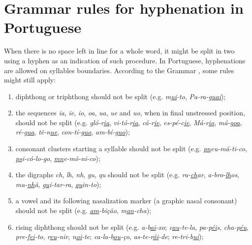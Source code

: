 \documentclass{article}
\begin{document}
\section{Grammar rules for hyphenation in Portuguese}
When there is no space left in line for a whole word, it might be split in two
using a hyphen as an indication of such procedure. In Portuguese, hyphenations
are allowed on syllables boundaries. According to the Grammar
\cite{cunha2016,bergstrom2011}, some rules might still apply:
\begin{enumerate}
    \item\label{rule-di-triphthong} diphthong or triphthong should not be split
	(e.g. \emph{m\underline{\emph{ui}}-to}, \emph{Pa-ra-g\underline{\emph{uai}}});
    \item\label{rule-unstressed} the sequences \emph{ia}, \emph{ie}, \emph{io}, \emph{oa}, \emph{ua},
	\emph{ue} and \emph{uo}, when in final unstressed position, should not be split 
	(e.g. \emph{gló-r\underline{\emph{ia}}}, \emph{vi-tó-r\underline{\emph{ia}}}, 
	\emph{cá-r\underline{\emph{ie}}}, \emph{es-pé-c\underline{\emph{ie}}}, 
	\emph{Má-r\underline{\emph{io}}}, \emph{má-g\underline{\emph{oa}}}, 
	\emph{ré-g\underline{\emph{ua}}}, \emph{tê-n\underline{\emph{ue}}}, 
	\emph{con-tí-g\underline{\emph{uo}}}, \emph{am-bí-g\underline{\emph{uo}}});
    \item\label{rule-c-clusters} consonant clusters starting a syllable should not be
	split (e.g. \emph{\underline{\emph{pn}}eu-má-ti-co}, \emph{\underline{\emph{ps}}i-có-lo-go}, 
	\emph{\underline{\emph{mn}}e-mô-ni-co});
    \item\label{rules-digraphs-ns} the digraphs \emph{ch}, \emph{lh}, \emph{nh}, \emph{gu}, \emph{qu} 
	should not be split (e.g. \emph{ra-\underline{\emph{ch}}ar},
	\emph{a-bro-\underline{\emph{lh}}os}, \emph{ma-\underline{\emph{nh}}ã},
	\emph{\underline{\emph{gu}}i-tar-ra}, \emph{\underline{\emph{qu}}in-to});
    \item\label{rule-nasalization} a vowel and its following nasalization marker (a graphic
	nasal consonant) should not be split (e.g. \emph{\underline{\emph{am}}-bição},
	\emph{m\underline{\emph{an}}-cha});
    \item\label{rule-rising} rising diphthong should not be split (e.g.
	\emph{a-b\underline{\emph{ai}}-xo}; \emph{c\underline{\emph{au}}-te-la}, 
	\emph{pa-p\underline{\emph{éi}}s}, \emph{cha-p\underline{\emph{éu}}}, 
	\emph{pre-f\underline{\emph{ei}}-to}, \emph{r\underline{\emph{eu}}-nir},
	\emph{n\underline{\emph{oi}}-te}; \emph{ca-la-b\underline{\emph{ou}}-ço}, 
	\emph{as-te-r\underline{\emph{ói}}-de}; 
	\emph{re-tri-b\underline{\emph{ui}}});


\end{enumerate}
\end{document}
